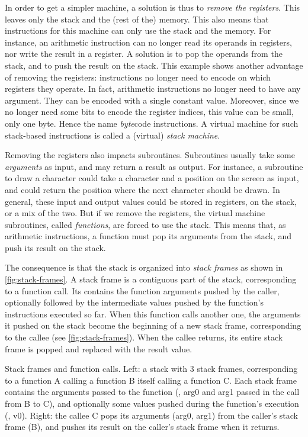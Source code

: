 In order to get a simpler machine, a solution is thus to {\em remove the
registers}. This leaves only the stack and the (rest of the) memory. This also
means that instructions for this machine can only use the stack and the memory.
For instance, an arithmetic instruction can no longer read its operands in
registers, nor write the result in a register. A solution is to pop the
operands from the stack, and to push the result on the stack. This example
shows another advantage of removing the registers: instructions no longer need
to encode on which registers they operate. In fact, arithmetic instructions no
longer need to have any argument. They can be encoded with a single constant
value. Moreover, since we no longer need some bits to encode the register
indices, this value can be small, only one byte. Hence the name {\em byte}code
instructions. A virtual machine for such stack-based instructions is called a
(virtual) {\em stack machine}.

Removing the registers also impacts subroutines. Subroutines usually take some
{\em arguments} as input, and may return a result as output. For instance, a
subroutine to draw a character could take a character and a position on the
screen as input, and could return the position where the next character should
be drawn. In general, these input and output values could be stored in
registers, on the stack, or a mix of the two. But if we remove the registers,
the virtual machine subroutines, called {\em functions}, are forced to use the
stack. This means that, as arithmetic instructions, a function must pop its
arguments from the stack, and push its result on the stack.

The consequence is that the stack is organized into {\em stack frames} as shown
in \cref{fig:stack-frames}. A stack frame is a contiguous part of the stack,
corresponding to a function call. Its contains the function arguments pushed by
the caller, optionally followed by the intermediate values pushed by the
function's instructions executed so far. When this function calls another one,
the arguments it pushed on the stack become the beginning of a new stack frame,
corresponding to the callee (see \cref{fig:stack-frames}). When the callee
returns, its entire stack frame is popped and replaced with the result value.

\begin{Figure}
  

  \caption{Stack frames and function calls. Left: a stack with 3 stack frames,
  corresponding to a function A calling a function B itself calling a function
  C. Each stack frame contains the arguments passed to the function (\eg, arg0
  and arg1 passed in the call from B to C), and optionally some values pushed
  during the function's execution (\eg, v0). Right: the callee C pops its
  arguments (arg0, arg1) from the caller's stack frame (B), and pushes its
  result on the caller's stack frame when it returns.}\label{fig:stack-frames}
\end{Figure}

